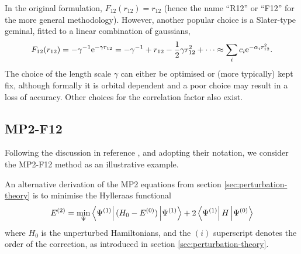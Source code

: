 In the original formulation, $F_{12}(r_{12})=r_{12}$ (hence the name ``R12'' or ``F12'' for the more general methodology). However, another popular choice is a Slater-type geminal, fitted to a linear combination of gaussians,
\begin{equation}
    \label{eq:f12-exponential}
    F_{12}(r_{12})=-\gamma^{-1}\mathrm{e}^{-\gamma r_{12}} = -\gamma^{-1}+r_{12}-\frac 12\gamma r_{12}^2+\cdots \approx \sum_i c_i\mathrm{e}^{-\alpha_ir_{12}^2}.
\end{equation}
The choice of the length scale $\gamma$ can either be optimised or (more typically) kept fix, although formally it is orbital dependent and a poor choice may result in a loss of accuracy.\supercite{tewRelaxing2018} Other choices for the correlation factor also exist.

\subsection{MP2-F12}

Following the discussion in reference , and adopting their notation, we consider the MP2-F12 method as an illustrative example.

An alternative derivation of the \gls{MP2} equations from section \ref{sec:perturbation-theory} is to minimise the Hylleraas functional
\begin{equation}
    \label{eq:hyllerass-functional}
    E^{(2)} = \min_\Psi\bra{\Psi^{(1)}}(H_0-E^{(0)})\ket{\Psi^{(1)}}+2\bra{\Psi^{(1)}}H\ket{\Psi^{(0)}}
\end{equation}
where $H_0$ is the unperturbed Hamiltonians, and the $(i)$ superscript denotes the order of the correction, as introduced in section \ref{sec:perturbation-theory}.

